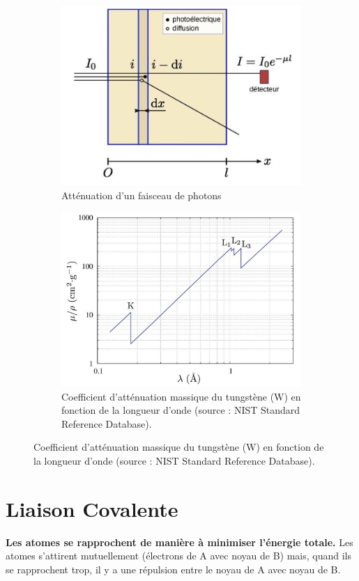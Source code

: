 \documentclass{article}
\begin{document}
\begin{figure}[h]
    \centering
    \begin{subfigure}{0.48\textwidth}
        \centering
        \includegraphics[width=0.8\linewidth]{Fig/filtre-rx.png}
        \caption{Atténuation d'un faisceau de photons}
        \label{fig:atténuation photons}
    \end{subfigure}
    \hfill\begin{subfigure}{0.48\textwidth}
        \centering
        \includegraphics[width=0.7\linewidth]{Fig/coef_absorption.png}
        \caption{Coefficient d'atténuation massique du tungstène (W) en fonction de la longueur d'onde (source : NIST Standard Reference Database). }
        \label{fig:coef absoption}
    \end{subfigure}
\end{figure}




\section{Liaison Covalente}\label{sec:Liaison covalente}
\textbf{Les atomes se rapprochent de manière à minimiser l'énergie totale.}
Les atomes s'attirent mutuellement (électrons de A avec noyau de B) mais, quand ils se rapprochent trop, il y a une répulsion entre le noyau de A avec noyau de B.
\end{document}

